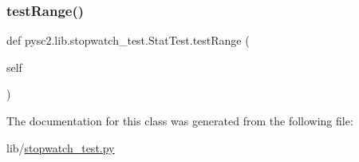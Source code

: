\mbox{\label{classpysc2_1_1lib_1_1stopwatch__test_1_1_stat_test_a08881b8c285f4b47606e1570888154ab}} 
\subsubsection{\texorpdfstring{test\+Range()}{testRange()}}
{\footnotesize\ttfamily def pysc2.\+lib.\+stopwatch\+\_\+test.\+Stat\+Test.\+test\+Range (\begin{DoxyParamCaption}\item[{}]{self }\end{DoxyParamCaption})}



The documentation for this class was generated from the following file\+:\begin{DoxyCompactItemize}
\item 
lib/\mbox{\hyperlink{stopwatch__test_8py}{stopwatch\+\_\+test.\+py}}\end{DoxyCompactItemize}
